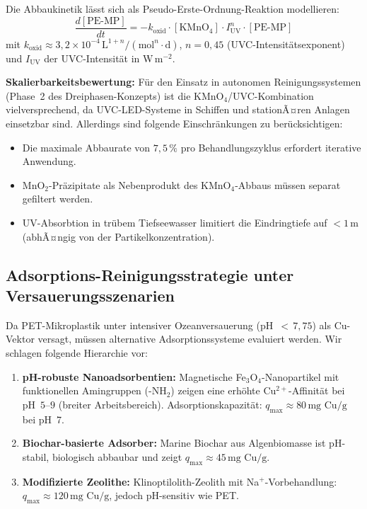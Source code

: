 ﻿\documentclass[12pt,a4paper]{article}
\theoremstyle{definition}
\theoremstyle{remark}
\begin{document}
Die Abbaukinetik l\"asst sich als Pseudo-Erste-Ordnung-Reaktion modellieren:
\begin{equation}
  \frac{d[\text{PE-MP}]}{dt} = -k_{\text{oxid}} \cdot [\text{KMnO}_4] \cdot
  I_{\text{UV}}^n \cdot [\text{PE-MP}]
  \label{eq:oxidation_kinetics}
\end{equation}
mit $k_{\text{oxid}} \approx 3{,}2 \times 10^{-4}\,\text{L}^{1+n}/(\text{mol}^n \cdot \text{d})$,
$n = 0{,}45$ (UVC-Intensit\"atsexponent) und $I_{\text{UV}}$ der UVC-Intensit\"at
in W\,m$^{-2}$.

\textbf{Skalierbarkeitsbewertung:} F\"ur den Einsatz in autonomen Reinigungssystemen
(Phase~2 des Dreiphasen-Konzepts) ist die KMnO$_4$/UVC-Kombination vielversprechend,
da UVC-LED-Systeme in Schiffen und stationÃ¤ren Anlagen einsetzbar sind.
Allerdings sind folgende Einschr\"ankungen zu ber\"ucksichtigen:
\begin{itemize}[noitemsep]
  \item Die maximale Abbaurate von $7{,}5\,\%$ pro Behandlungszyklus
    erfordert iterative Anwendung.
  \item MnO$_2$-Pr\"azipitate als Nebenprodukt des KMnO$_4$-Abbaus m\"ussen
    separat gefiltert werden.
  \item UV-Absorbtion in tr\"ubem Tiefseewasser limitiert die Eindringtiefe auf
    $< 1$\,m (abhÃ¤ngig von der Partikelkonzentration).
\end{itemize}

\subsection{Adsorptions-Reinigungsstrategie unter Versauerungsszenarien}
\label{subsec:adsorption_strategy}

Da PET-Mikroplastik unter intensiver Ozeanversauerung (pH~$<\,7{,}75$) als
Cu-Vektor versagt, m\"ussen alternative Adsorptionssysteme evaluiert werden.
Wir schlagen folgende Hierarchie vor:

\begin{enumerate}[leftmargin=*, label=\textbf{A\arabic*.}]
  \item \textbf{pH-robuste Nanoadsorbentien:} Magnetische Fe$_3$O$_4$-Nanopartikel
    mit funktionellen Amingruppen (-NH$_2$) zeigen eine erh\"ohte
    Cu$^{2+}$-Affinit\"at bei pH~$5$--$9$ (breiter Arbeitsbereich).
    Adsorptionskapazit\"at: $q_{\max} \approx 80\,\text{mg Cu/g}$ bei pH~7.
  \item \textbf{Biochar-basierte Adsorber:} Marine Biochar aus Algenbiomasse
    ist pH-stabil, biologisch abbaubar und zeigt $q_{\max} \approx 45\,\text{mg Cu/g}$.
  \item \textbf{Modifizierte Zeolithe:} Klinoptilolith-Zeolith mit
    Na$^+$-Vorbehandlung: $q_{\max} \approx 120\,\text{mg Cu/g}$,
    jedoch pH-sensitiv wie PET.
\end{enumerate}
\end{document}
